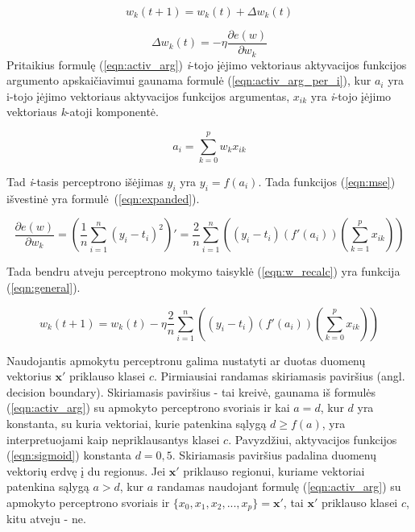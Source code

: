 \begin{equation}
	\label{eqn:w_recalc}
	w_k(t + 1) = w_k(t) + \Delta w_k(t)
\end{equation}

\begin{equation}
	\label{eqn:w_change}
	\Delta w_k(t) = - \eta \dfrac{\partial e(w)}{\partial w_k}
\end{equation}
Pritaikius formulę (\ref{eqn:activ_arg}) \textit{i}-tojo įėjimo vektoriaus aktyvacijos funkcijos argumento apskaičiavimui gaunama formulė (\ref{eqn:activ_arg_per_i}), kur $a_i$ yra i-tojo įėjimo vektoriaus aktyvacijos funkcijos argumentas, $x_{ik}$ yra \textit{i}-tojo įėjimo vektoriaus \textit{k}-atoji komponentė.

\begin{equation}
	\label{eqn:activ_arg_per_i}
	a_i = \sum_{k = 0}^{p} w_{k}x_{ik}
\end{equation}

Tad \textit{i}-tasis perceptrono išėjimas $y_i$ yra $y_i = f(a_i)$. Tada funkcijos (\ref{eqn:mse}) išvestinė yra formulė~(\ref{eqn:expanded}).

\begin{equation}
	\label{eqn:expanded}
	\dfrac{\partial e(w)}{\partial w_k} = (\dfrac{1}{n}\sum_{i=1}^{n} (y_i - t_i)^2)'
		= \dfrac{2}{n}\sum_{i=1}^{n}
			((y_i - t_i)(f'(a_i))(\sum_{k = 1}^{p} x_{ik}))
\end{equation}

Tada bendru atveju perceptrono mokymo taisyklė (\ref{eqn:w_recalc}) yra funkcija (\ref{eqn:general}).

\begin{equation}
	\label{eqn:general}
	w_k(t + 1) = w_k(t) - \eta \dfrac{2}{n}\sum_{i=1}^{n} ((y_i - t_i)(f'(a_i))(\sum_{k = 0}^{p} x_{ik}))
\end{equation}

Naudojantis apmokytu perceptronu galima nustatyti ar duotas duomenų vektorius $\boldsymbol{x}'$ priklauso klasei $c$. Pirmiausiai randamas skiriamasis paviršius (angl. decision boundary). Skiriamasis paviršius - tai kreivė, gaunama iš formulės (\ref{eqn:activ_arg}) su apmokyto perceptrono svoriais ir kai $a = d$, kur $d$ yra konstanta, su kuria vektoriai, kurie patenkina sąlygą $d \ge f(a)$, yra interpretuojami kaip nepriklausantys klasei $c$. Pavyzdžiui, aktyvacijos funkcijos (\ref{eqn:sigmoid}) konstanta $d = 0,5$. Skiriamasis paviršius padalina duomenų vektorių erdvę į du regionus. Jei $\boldsymbol{x}'$ priklauso regionui, kuriame vektoriai patenkina sąlygą $a > d$, kur $a$ randamas naudojant formulę (\ref{eqn:activ_arg}) su apmokyto perceptrono svoriais ir $\{x_{0}, x_{1}, x_{2}, ..., x_{p}\} = \boldsymbol{x}'$, tai $\boldsymbol{x}'$ priklauso klasei $c$, kitu atveju - ne.